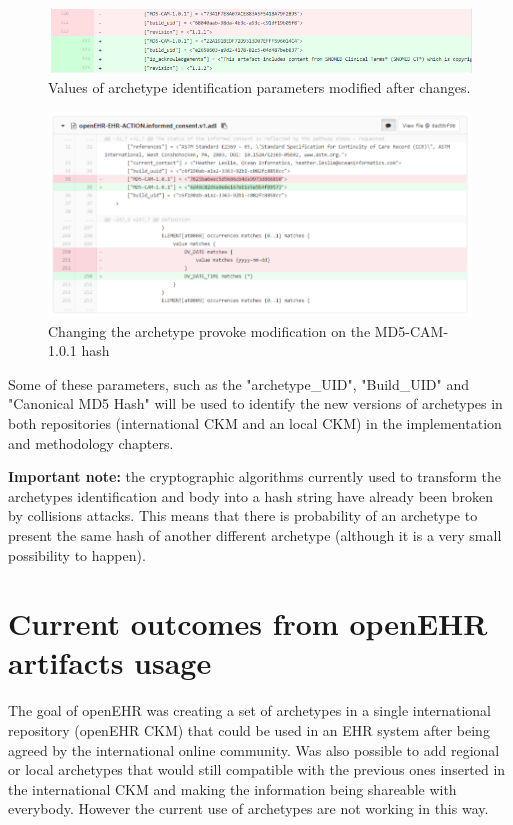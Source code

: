 \documentclass[mim_thesis.tex]{subfiles}
\begin{document}
\begin{figure}[H]
	\centering
  \includegraphics[width=1\textwidth]{img/compare_arch_versions.PNG}
	\caption{Values of archetype identification parameters modified after changes.}
	\label{fig:compare_arch_versions.PNG}
\end{figure}

\begin{figure}[H]
	\centering
  \includegraphics[width=1\textwidth]{img/MD5_hash_diff.PNG}
	\caption{Changing the archetype provoke modification on the MD5-CAM-1.0.1 hash}
	\label{fig:MD5_hash_diff}
\end{figure}

Some of these parameters, such as the "archetype\_UID", "Build\_UID" and "Canonical MD5 Hash" will be used to identify the new versions of archetypes in both repositories (international CKM and an local CKM) in the implementation and methodology chapters.


\textbf{Important note:} the cryptographic algorithms currently used to transform the archetypes identification and body into a hash string have already been broken by collisions attacks. This means that there is probability of an archetype to present the same hash of another different archetype (although it is a very small possibility to happen).


\section{Current outcomes from openEHR artifacts usage}
The goal of openEHR was creating a set of archetypes in a single international repository (openEHR CKM) that could be used in an EHR system after being agreed by the international online community. Was also possible to add regional or local archetypes that would still compatible with the previous ones inserted in the international CKM and making the information being shareable with everybody. However the current use of archetypes are not working in this way. 
\end{document}
